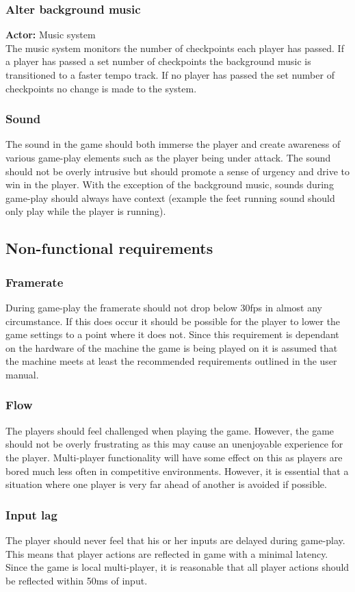 \documentclass[11pt,a4paper]{article}
\begin{document}
\subsubsection{Alter background music}
\textbf{Actor:} Music system\smallskip\\
The music system monitors the number of checkpoints each player has passed. If a player has passed a set number of checkpoints the background music is transitioned to a faster tempo track.
If no player has passed the set number of checkpoints no change is made to the system.

\subsubsection{Sound}
The sound in the game should both immerse the player and create awareness of various game-play elements such as the player being under attack. The sound should not be overly intrusive but should promote a sense of urgency and drive to win in the player. With the exception of the background music, sounds during game-play should always have context (example the feet running sound should only play while the player is running).
\subsection{Non-functional requirements}
\subsubsection{Framerate}
During game-play the framerate should not drop below 30fps in almost any circumstance. If this does occur it should be possible for the player to lower the game settings to a point where it does not. Since this requirement is dependant on the hardware of the machine the game is being played on it is assumed that the machine meets at least the recommended requirements outlined in the user manual.
\subsubsection{Flow}
The players should feel challenged when playing the game. However, the game should not be overly frustrating as this may cause an unenjoyable experience for the player. Multi-player functionality will have some effect on this as players are bored much less often in competitive environments. However, it is essential that a situation where one player is very far ahead of another is avoided if possible.
\subsubsection{Input lag}
The player should never feel that his or her inputs are delayed during game-play. This means that player actions are reflected in game with a minimal latency. Since the game is local multi-player, it is reasonable that all player actions should be reflected within 50ms of input.
\end{document}
